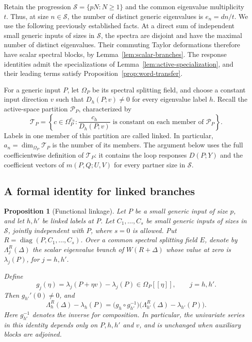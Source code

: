 \documentclass[11pt]{article}
\newtheorem{proposition}[theorem]{Proposition}
\theoremstyle{definition}
\theoremstyle{remark}
\numberwithin{equation}{section}
\begin{document}
Retain the progression $\mathcal S=\{pN:N\geq 1\}$ and the common
eigenvalue multiplicity $t$.  Thus, at size $n\in\mathcal S$, the number
of distinct generic eigenvalues is $e_n=dn/t$.  We use the following
previously established facts.  At a direct sum of independent small
generic inputs of sizes in $\mathcal S$, the spectra are disjoint and
have the maximal number of distinct eigenvalues.  Their commuting
Taylor deformations therefore have scalar spectral blocks, by
Lemma~\ref{lem:scalar-branches}.  The response identities admit the
specializations of Lemma~\ref{lem:active-specialization}, and their
leading terms satisfy Proposition~\ref{prop:word-transfer}.

For a generic input $P$, let $\Omega_P$ be its spectral splitting
field, and choose a constant input direction $v$ such that
$D_h(P;v)\neq 0$ for every eigenvalue label $h$.  Recall the active-space
partition $\mathcal P_P$, characterized by
\begin{equation}
 \mathcal T_P
 =\left\{c\in\Omega_P^{e_n}:
       \frac{c_h}{D_h(P;v)}
       \text{ is constant on each member of }\mathcal P_P\right\}.
 \label{eq:linkage-partition}
\end{equation}
Labels in one member of this partition are called linked.  In particular,
$a_n=\dim_{\Omega_P}\mathcal T_P$ is the number of its members.
The argument below uses the full coefficientwise definition of
$\mathcal T_P$: it contains the loop responses $D(P;Y)$ and the
coefficient vectors of $m(P,Q;U,V)$ for every partner size in
$\mathcal S$.

\subsection{A formal identity for linked branches}

\begin{proposition}[Functional linkage]
\label{prop:functional-linkage}
Let $P$ be a small generic input of size $p$, and let $h,h'$ be linked
labels at $P$.  Let $C_1,\ldots,C_s$ be small generic inputs of sizes in
$\mathcal S$, jointly independent with $P$, where $s=0$ is allowed.
Put $R=\operatorname{diag}(P,C_1,\ldots,C_s)$.
Over a common spectral splitting field $E$, denote by
$\Lambda_j^R(\Delta)$ the scalar eigenvalue branch of $W(R+\Delta)$
whose value at zero is $\lambda_j(P)$, for $j=h,h'$.

Define
\[
 g_j(\eta)=\lambda_j(P+\eta v)-\lambda_j(P)
 \in\Omega_P[[\eta]],\qquad j=h,h'.
\]
Then $g_{h'}'(0)\neq 0$, and
\begin{equation}
 \Lambda_h^R(\Delta)-\lambda_h(P)
 =\bigl(g_h\circ g_{h'}^{-1}\bigr)
       \bigl(\Lambda_{h'}^R(\Delta)-\lambda_{h'}(P)\bigr).
 \label{eq:functional-linkage}
\end{equation}
Here $g_{h'}^{-1}$ denotes the inverse for composition.  In particular,
the univariate series in this identity depends only on $P,h,h'$ and $v$,
and is unchanged when auxiliary blocks are adjoined.
\end{proposition}
\end{document}
